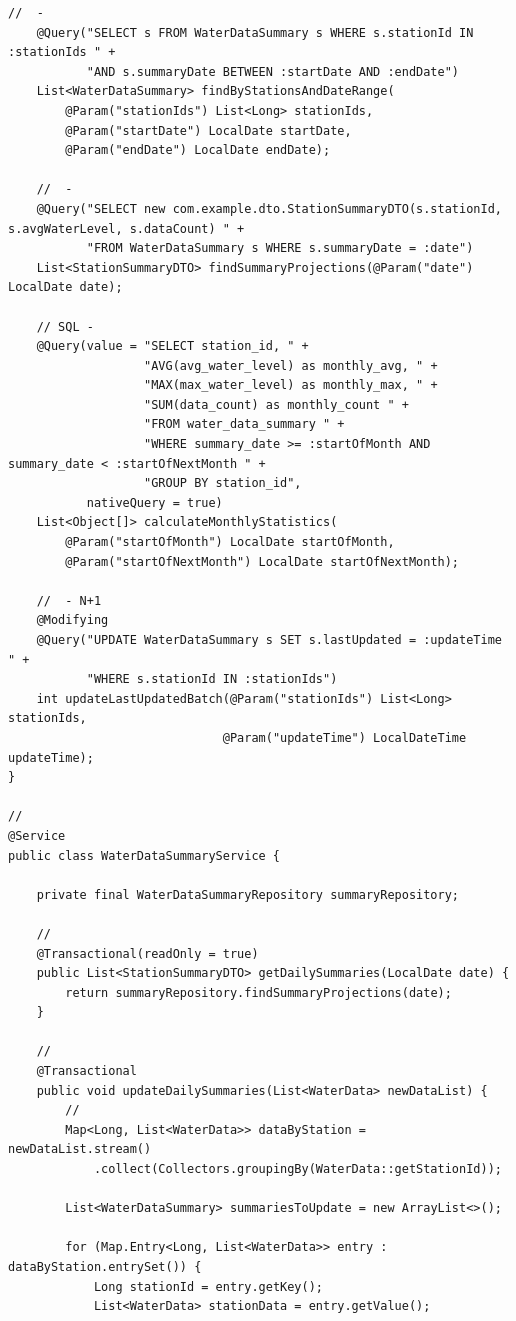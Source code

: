 \begin{lstlisting}[style=java]
    //  - 
    @Query("SELECT s FROM WaterDataSummary s WHERE s.stationId IN :stationIds " +
           "AND s.summaryDate BETWEEN :startDate AND :endDate")
    List<WaterDataSummary> findByStationsAndDateRange(
        @Param("stationIds") List<Long> stationIds,
        @Param("startDate") LocalDate startDate,
        @Param("endDate") LocalDate endDate);
    
    //  - 
    @Query("SELECT new com.example.dto.StationSummaryDTO(s.stationId, s.avgWaterLevel, s.dataCount) " +
           "FROM WaterDataSummary s WHERE s.summaryDate = :date")
    List<StationSummaryDTO> findSummaryProjections(@Param("date") LocalDate date);
    
    // SQL - 
    @Query(value = "SELECT station_id, " +
                   "AVG(avg_water_level) as monthly_avg, " +
                   "MAX(max_water_level) as monthly_max, " +
                   "SUM(data_count) as monthly_count " +
                   "FROM water_data_summary " +
                   "WHERE summary_date >= :startOfMonth AND summary_date < :startOfNextMonth " +
                   "GROUP BY station_id",
           nativeQuery = true)
    List<Object[]> calculateMonthlyStatistics(
        @Param("startOfMonth") LocalDate startOfMonth,
        @Param("startOfNextMonth") LocalDate startOfNextMonth);
    
    //  - N+1
    @Modifying
    @Query("UPDATE WaterDataSummary s SET s.lastUpdated = :updateTime " +
           "WHERE s.stationId IN :stationIds")
    int updateLastUpdatedBatch(@Param("stationIds") List<Long> stationIds,
                              @Param("updateTime") LocalDateTime updateTime);
}

// 
@Service
public class WaterDataSummaryService {
    
    private final WaterDataSummaryRepository summaryRepository;
    
    // 
    @Transactional(readOnly = true)
    public List<StationSummaryDTO> getDailySummaries(LocalDate date) {
        return summaryRepository.findSummaryProjections(date);
    }
    
    // 
    @Transactional
    public void updateDailySummaries(List<WaterData> newDataList) {
        // 
        Map<Long, List<WaterData>> dataByStation = newDataList.stream()
            .collect(Collectors.groupingBy(WaterData::getStationId));
        
        List<WaterDataSummary> summariesToUpdate = new ArrayList<>();
        
        for (Map.Entry<Long, List<WaterData>> entry : dataByStation.entrySet()) {
            Long stationId = entry.getKey();
            List<WaterData> stationData = entry.getValue();
            

\end{lstlisting}
